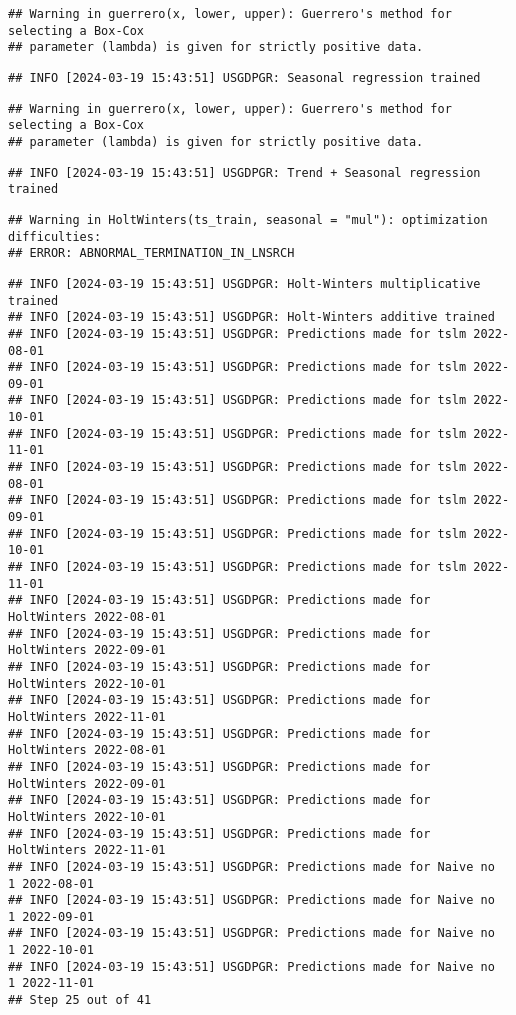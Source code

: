\documentclass[
]{article}
\begin{document}
\begin{verbatim}
## Warning in guerrero(x, lower, upper): Guerrero's method for selecting a Box-Cox
## parameter (lambda) is given for strictly positive data.
\end{verbatim}

\begin{verbatim}
## INFO [2024-03-19 15:43:51] USGDPGR: Seasonal regression trained
\end{verbatim}

\begin{verbatim}
## Warning in guerrero(x, lower, upper): Guerrero's method for selecting a Box-Cox
## parameter (lambda) is given for strictly positive data.
\end{verbatim}

\begin{verbatim}
## INFO [2024-03-19 15:43:51] USGDPGR: Trend + Seasonal regression trained
\end{verbatim}

\begin{verbatim}
## Warning in HoltWinters(ts_train, seasonal = "mul"): optimization difficulties:
## ERROR: ABNORMAL_TERMINATION_IN_LNSRCH
\end{verbatim}

\begin{verbatim}
## INFO [2024-03-19 15:43:51] USGDPGR: Holt-Winters multiplicative trained
## INFO [2024-03-19 15:43:51] USGDPGR: Holt-Winters additive trained
## INFO [2024-03-19 15:43:51] USGDPGR: Predictions made for tslm 2022-08-01
## INFO [2024-03-19 15:43:51] USGDPGR: Predictions made for tslm 2022-09-01
## INFO [2024-03-19 15:43:51] USGDPGR: Predictions made for tslm 2022-10-01
## INFO [2024-03-19 15:43:51] USGDPGR: Predictions made for tslm 2022-11-01
## INFO [2024-03-19 15:43:51] USGDPGR: Predictions made for tslm 2022-08-01
## INFO [2024-03-19 15:43:51] USGDPGR: Predictions made for tslm 2022-09-01
## INFO [2024-03-19 15:43:51] USGDPGR: Predictions made for tslm 2022-10-01
## INFO [2024-03-19 15:43:51] USGDPGR: Predictions made for tslm 2022-11-01
## INFO [2024-03-19 15:43:51] USGDPGR: Predictions made for HoltWinters 2022-08-01
## INFO [2024-03-19 15:43:51] USGDPGR: Predictions made for HoltWinters 2022-09-01
## INFO [2024-03-19 15:43:51] USGDPGR: Predictions made for HoltWinters 2022-10-01
## INFO [2024-03-19 15:43:51] USGDPGR: Predictions made for HoltWinters 2022-11-01
## INFO [2024-03-19 15:43:51] USGDPGR: Predictions made for HoltWinters 2022-08-01
## INFO [2024-03-19 15:43:51] USGDPGR: Predictions made for HoltWinters 2022-09-01
## INFO [2024-03-19 15:43:51] USGDPGR: Predictions made for HoltWinters 2022-10-01
## INFO [2024-03-19 15:43:51] USGDPGR: Predictions made for HoltWinters 2022-11-01
## INFO [2024-03-19 15:43:51] USGDPGR: Predictions made for Naive no  1 2022-08-01
## INFO [2024-03-19 15:43:51] USGDPGR: Predictions made for Naive no  1 2022-09-01
## INFO [2024-03-19 15:43:51] USGDPGR: Predictions made for Naive no  1 2022-10-01
## INFO [2024-03-19 15:43:51] USGDPGR: Predictions made for Naive no  1 2022-11-01
## Step 25 out of 41
\end{verbatim}
\end{document}
